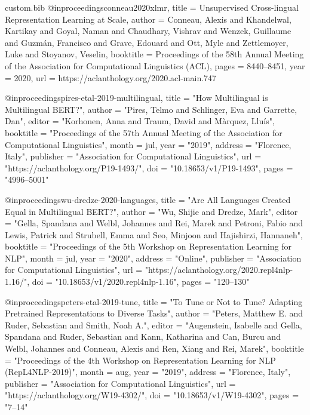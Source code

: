 \begin{filecontents*}[overwrite]{custom.bib}
@inproceedings{conneau2020xlmr,
  title        = {Unsupervised Cross-lingual Representation Learning at Scale},
  author       = {Conneau, Alexis and Khandelwal, Kartikay and Goyal, Naman and Chaudhary, Vishrav and Wenzek, Guillaume and Guzm{\'a}n, Francisco and Grave, Edouard and Ott, Myle and Zettlemoyer, Luke and Stoyanov, Veselin},
  booktitle    = {Proceedings of the 58th Annual Meeting of the Association for Computational Linguistics (ACL)},
  pages        = {8440--8451},
  year         = {2020},
  url          = {https://aclanthology.org/2020.acl-main.747}
}

@inproceedings{pires-etal-2019-multilingual,
    title = "How Multilingual is Multilingual {BERT}?",
    author = "Pires, Telmo  and
      Schlinger, Eva  and
      Garrette, Dan",
    editor = "Korhonen, Anna  and
      Traum, David  and
      M{\`a}rquez, Llu{\'i}s",
    booktitle = "Proceedings of the 57th Annual Meeting of the Association for Computational Linguistics",
    month = jul,
    year = "2019",
    address = "Florence, Italy",
    publisher = "Association for Computational Linguistics",
    url = "https://aclanthology.org/P19-1493/",
    doi = "10.18653/v1/P19-1493",
    pages = "4996--5001"
}

@inproceedings{wu-dredze-2020-languages,
    title = "Are All Languages Created Equal in Multilingual {BERT}?",
    author = "Wu, Shijie  and
      Dredze, Mark",
    editor = "Gella, Spandana  and
      Welbl, Johannes  and
      Rei, Marek  and
      Petroni, Fabio  and
      Lewis, Patrick  and
      Strubell, Emma  and
      Seo, Minjoon  and
      Hajishirzi, Hannaneh",
    booktitle = "Proceedings of the 5th Workshop on Representation Learning for NLP",
    month = jul,
    year = "2020",
    address = "Online",
    publisher = "Association for Computational Linguistics",
    url = "https://aclanthology.org/2020.repl4nlp-1.16/",
    doi = "10.18653/v1/2020.repl4nlp-1.16",
    pages = "120--130"
}

@inproceedings{peters-etal-2019-tune,
    title = "To Tune or Not to Tune? Adapting Pretrained Representations to Diverse Tasks",
    author = "Peters, Matthew E.  and
      Ruder, Sebastian  and
      Smith, Noah A.",
    editor = "Augenstein, Isabelle  and
      Gella, Spandana  and
      Ruder, Sebastian  and
      Kann, Katharina  and
      Can, Burcu  and
      Welbl, Johannes  and
      Conneau, Alexis  and
      Ren, Xiang  and
      Rei, Marek",
    booktitle = "Proceedings of the 4th Workshop on Representation Learning for NLP (RepL4NLP-2019)",
    month = aug,
    year = "2019",
    address = "Florence, Italy",
    publisher = "Association for Computational Linguistics",
    url = "https://aclanthology.org/W19-4302/",
    doi = "10.18653/v1/W19-4302",
    pages = "7--14"
}


\end{filecontents*}
